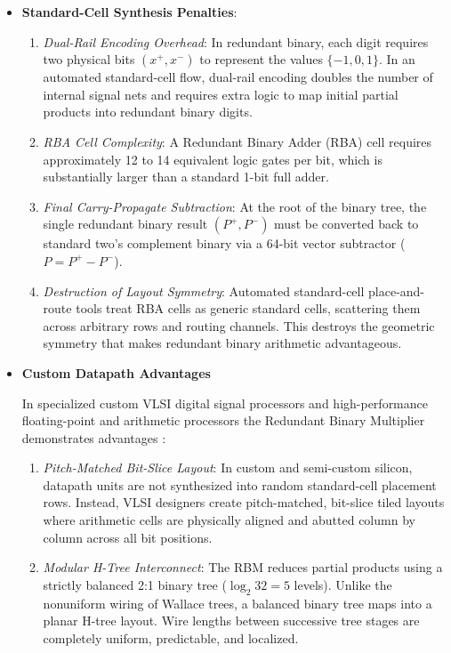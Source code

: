 \begin{itemize}
    \item \textbf{Standard-Cell Synthesis Penalties}:
    \begin{enumerate}
        \item \textit{Dual-Rail Encoding Overhead}: In redundant binary, each digit requires two physical bits $(x^+, x^-)$ to represent the values $\{-1, 0, 1\}$. In an automated standard-cell flow, dual-rail encoding doubles the number of internal signal nets and requires extra logic to map initial partial products into redundant binary digits.
        
        \item \textit{RBA Cell Complexity}: A Redundant Binary Adder (RBA) cell requires approximately 12 to 14 equivalent logic gates per bit, which is substantially larger than a standard 1-bit full adder.
        
        \item \textit{Final Carry-Propagate Subtraction}: At the root of the binary tree, the single redundant binary result $(P^+, P^-)$ must be converted back to standard two's complement binary via a 64-bit vector subtractor ($P = P^+ - P^-$).
        
        \item \textit{Destruction of Layout Symmetry}: Automated standard-cell place-and-route tools treat RBA cells as generic standard cells, scattering them across arbitrary rows and routing channels. This destroys the geometric symmetry that makes redundant binary arithmetic advantageous.
    \end{enumerate}

    \item \textbf{Custom Datapath Advantages}
    
    In specialized custom VLSI digital signal processors and high-performance floating-point and arithmetic processors the Redundant Binary Multiplier demonstrates advantages \cite{harata1987, makino1996, edamatsu1988}:
    \begin{enumerate}
        \item \textit{Pitch-Matched Bit-Slice Layout}: In custom and semi-custom silicon, datapath units are not synthesized into random standard-cell placement rows. Instead, VLSI designers create pitch-matched, bit-slice tiled layouts where arithmetic cells are physically aligned and abutted column by column across all bit positions.
        
        \item \textit{Modular H-Tree Interconnect}: The RBM reduces partial products using a strictly balanced 2:1 binary tree ($\log_2 32 = 5$ levels). Unlike the nonuniform wiring of Wallace trees, a balanced binary tree maps into a planar H-tree layout. Wire lengths between successive tree stages are completely uniform, predictable, and localized.
        

\end{enumerate}
\end{itemize}
